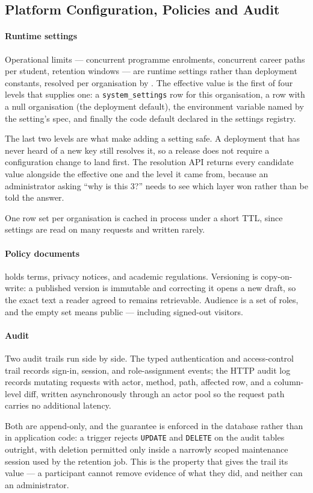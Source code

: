 \subsection{Platform Configuration, Policies and Audit}
\label{sec:impl_configuration}

\paragraph{Runtime settings}
Operational limits --- concurrent programme enrolments, concurrent career paths per student, retention windows --- are runtime settings rather than deployment constants, resolved per organisation by . The effective value is the first of four levels that supplies one: a \texttt{system\_settings} row for this organisation, a row with a null organisation (the deployment default), the environment variable named by the setting's spec, and finally the code default declared in the settings registry.

The last two levels are what make adding a setting safe. A deployment that has never heard of a new key still resolves it, so a release does not require a configuration change to land first. The resolution API returns every candidate value alongside the effective one and the level it came from, because an administrator asking ``why is this 3?'' needs to see which layer won rather than be told the answer.

One row set per organisation is cached in process under a short TTL, since settings are read on many requests and written rarely.

\paragraph{Policy documents}
 holds terms, privacy notices, and academic regulations. Versioning is copy-on-write: a published version is immutable and correcting it opens a new draft, so the exact text a reader agreed to remains retrievable. Audience is a set of roles, and the empty set means public --- including signed-out visitors.

\paragraph{Audit}
Two audit trails run side by side. The typed authentication and access-control trail records sign-in, session, and role-assignment events; the HTTP audit log records mutating requests with actor, method, path, affected row, and a column-level diff, written asynchronously through an actor pool so the request path carries no additional latency.

Both are append-only, and the guarantee is enforced in the database rather than in application code: a trigger rejects \texttt{UPDATE} and \texttt{DELETE} on the audit tables outright, with deletion permitted only inside a narrowly scoped maintenance session used by the retention job. This is the property that gives the trail its value --- a participant cannot remove evidence of what they did, and neither can an administrator.

